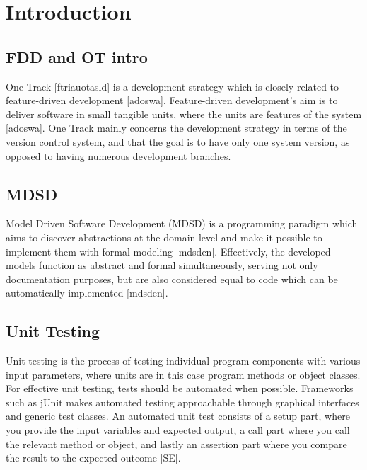 \documentclass[fina_report_innit.tex]{subfiles}
\begin{document}
\section{Introduction}

\subsection*{FDD and OT intro}
One Track [ftriauotasld] is a development strategy which is closely related to feature-driven development [adoswa]. Feature-driven development's aim is to deliver software in small tangible units, where the units are features of the system [adoswa]. One Track mainly concerns the development strategy in terms of the version control system, and that the goal is to have only one system version, as opposed to having numerous development branches. 

\subsection*{MDSD}
Model Driven Software Development (MDSD) is a programming paradigm which aims to discover abstractions at the domain level and make it possible to implement them with formal modeling [mdsden]. Effectively, the developed models function as abstract and formal simultaneously, serving not only documentation purposes, but are also considered equal to code which can be automatically implemented [mdsden].

\subsection*{Unit Testing}
Unit testing is the process of testing individual program components with various input parameters, where units are in this case program methods or object classes.
For effective unit testing, tests should be automated when possible.  Frameworks such as jUnit makes automated testing approachable through graphical interfaces and generic test classes. An automated unit test consists of a setup part, where you provide the input variables and expected output, a call part where you call the relevant method or object, and lastly an assertion part where you compare the result to the expected outcome [SE]. 
\end{document}

